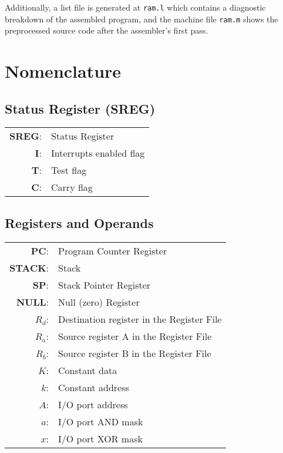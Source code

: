 \documentclass[12pt,twoside]{report}
\begin{document}
Additionally, a list file is generated at \texttt{ram.l} which
contains a diagnostic breakdown of the assembled program, and the
machine file \texttt{ram.m} shows the preprocessed source code after
the assembler's first pass.

\section{Nomenclature}

\subsection{Status Register (SREG)}

\begin{tabular}{ | r | l | }
  \hline
  \textbf{SREG}: & Status Register \\
  \textbf{I}: & Interrupts enabled flag \\
  \textbf{T}: & Test flag \\
  \textbf{C}: & Carry flag \\
  \hline
\end{tabular}

\subsection{Registers and Operands}

\begin{tabular}{ | r | l | }
  \hline
  \textbf{PC}: & Program Counter Register \\
  \textbf{STACK}: & Stack \\
  \textbf{SP}: & Stack Pointer Register \\
  \textbf{NULL}: & Null (zero) Register \\
  \textbf{$R_d$}: & Destination register in the Register File \\
  \textbf{$R_a$}: & Source register A in the Register File \\
  \textbf{$R_b$}: & Source register B in the Register File \\
  \textbf{$K$}: & Constant data \\
  \textbf{$k$}: & Constant address \\
  \textbf{$A$}: & I/O port address \\
  \textbf{$a$}: & I/O port AND mask \\
  \textbf{$x$}: & I/O port XOR mask \\
  \hline
\end{tabular}
\end{document}
